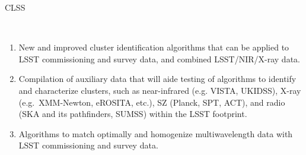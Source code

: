 {\begin{tasklist}{CLSS}
\begin{task}
{~
\begin{enumerate}
\item New and improved cluster identification algorithms that can be 
applied to LSST commissioning and survey data, and combined 
LSST/NIR/X-ray data.
\item Compilation of auxiliary data that will aide testing of algorithms 
to identify and characterize clusters, such as near-infrared (e.g. 
VISTA, UKIDSS), X-ray (e.g.~XMM-Newton, eROSITA, etc.), SZ (Planck, SPT, 
ACT), and radio (SKA and its pathfinders, SUMSS) within the LSST 
footprint.
\item Algorithms to match optimally and homogenize multiwavelength 
data with LSST commissioning and survey data.
\end{enumerate}
}
\end{task}


\end{tasklist}}
